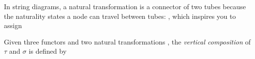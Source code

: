 In string diagrams, a natural transformation is a connector of two tubes
because the naturality states a node can travel between tubes:
, which inspires you to assign



\begin{definition}
Given three functors
and two natural transformations
, the \emph{vertical composition} of $\tau$ and $\sigma$
is defined by
\end{definition}

